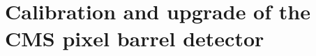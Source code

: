 \documentclass[a4paper, 11pt, twoside, openany]{ThesisStyle}
\begin{document}
			

			

	

	
	
	

	
	
\part{Calibration and upgrade of the CMS pixel barrel detector}

	
	
	
\end{document}
